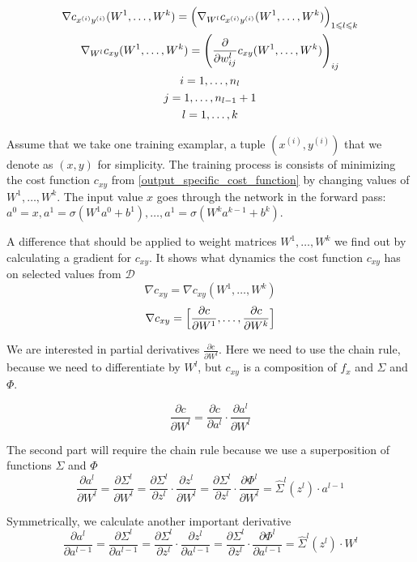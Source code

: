 \documentclass[draft]{article}
\begin{document}
\begin{gather}
\nabla c_{x^{(i)}y^{(i)}}(W^1,\dots,W^k) = \Bigl(\nabla_{W^l} c_{x^{(i)}y^{(i)}}(W^1,\dots,W^k) \Bigr)_{1\leqslant l \leqslant k} \\
\nabla_{W^l} c_{xy}(W^1,\dots,W^k) = \Biggl( \frac{\partial}{\partial w_{ij}^l} c_{xy}(W^1,\dots,W^k) \Biggr)_{ij} \\
i = 1,\dots,n_l \\
j = 1,\dots,n_{l-1} + 1 \\
l = 1,\dots,k
\end{gather}

Assume that we take one training examplar, a tuple $(x^{(i)}, y^{(i)})$ that we denote as $(x,y)$ for simplicity. The training process is consists of minimizing the cost function $c_{xy}$  from \eqref{output_specific_cost_function} by changing values of $W^1,\dots,W^k$. The input value $x$ goes through the network in the forward pass: $a^0 = x, a^1 = \sigma(W^1 a^0 + b^1), \dots, a^1 = \sigma(W^k a^{k-1} + b^k)$.

A difference that should be applied to weight matrices $W^1, \dots, W^k$ we find out by calculating a gradient for $c_{xy}$.
It shows what dynamics the cost function $c_{xy}$ has on selected values from $\mathcal{D}$
\[
\nabla c_{xy} = \nabla c_{xy}(W^1,\dots,W^k)
\]
\[
\nabla c_{xy} = \Bigl[\frac{\partial c}{\partial W^1}, \dots, \frac{\partial c}{\partial W^k}\Bigr]
\]

We are interested in partial derivatives $\frac{\partial c}{\partial W^l}$. Here we need to use the chain rule, because we need to differentiate by $W^l$, but $c_{xy}$ is a composition of $f_x$ and $\Sigma$ and $\Phi$.

\[
\frac{\partial c}{\partial W^l} = 
\frac{\partial c}{\partial a^l} \cdot \frac{\partial a^l}{\partial W^l}
\]

The second part will require the chain rule because we use a superposition of functions $\Sigma$ and $\Phi$
\[
\frac{\partial a^l}{\partial W^l} = 
\frac{\partial \Sigma^l}{\partial W^l} = 
\frac{\partial \Sigma^l}{\partial z^l} \cdot \frac{\partial z^l}{\partial W^l} = 
\frac{\partial \Sigma^l}{\partial z^l} \cdot \frac{\partial \Phi^l}{\partial W^l} = 
\hat\Sigma^l(z^l) \cdot a^{l-1}
\]

Symmetrically, we calculate another important derivative
\[
\frac{\partial a^l}{\partial a^{l-1}} = 
\frac{\partial \Sigma^l}{\partial a^{l-1}} = 
\frac{\partial \Sigma^l}{\partial z^l} \cdot \frac{\partial z^l}{\partial a^{l-1}} =
\frac{\partial \Sigma^l}{\partial z^l} \cdot \frac{\partial \Phi^l}{\partial a^{l-1}} =  
\hat\Sigma^l(z^l) \cdot W^l
\]
\end{document}
